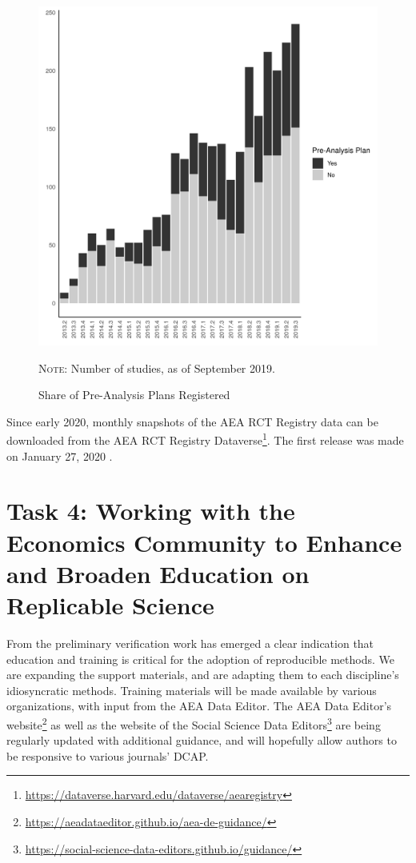 \documentclass[PP]{AEA}
\newcommand{\urlcite}[2]{#2\footnote{\url{#1}}}
\begin{document}
\begin{figure}[h]
	\includegraphics[width=\textwidth]{images/figure_preanalysisplans.png}
    \caption{Share of Pre-Analysis Plans Registered\label{fig:rct_pap}}
	
	\centering \footnotesize \textsc{Note:} Number of studies, as of September 2019.
\end{figure} 

Since early 2020, monthly snapshots of the AEA RCT Registry data can be downloaded from the \urlcite{https://dataverse.harvard.edu/dataverse/aearegistry}{AEA RCT Registry Dataverse}. The first release was made on January 27, 2020 \citep{DVN/DFMLIU_2020}.

\section{Task 4: Working with the Economics Community to Enhance and Broaden Education on Replicable Science}

From the preliminary verification work has emerged a clear indication that education and training is critical for the adoption of reproducible methods. We are expanding the support materials, and are adapting them to each discipline's idiosyncratic methods. Training materials will be made available by various organizations, with input from the AEA Data Editor. The \urlcite{https://aeadataeditor.github.io/aea-de-guidance/}{AEA Data Editor's website} as well as the website of the \urlcite{https://social-science-data-editors.github.io/guidance/}{Social Science Data Editors} are being regularly updated with additional guidance, and will hopefully allow authors to be responsive to various journals' \ac{DCAP}.
\end{document}
